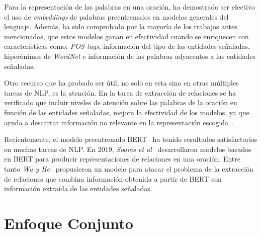Para la representación de las palabras en una oración, ha demostrado ser efectivo el uso de \textit{embeddings} de palabras preentrenados en modelos generales del lenguaje. 
Además, ha sido comprobado por la mayoría de los trabajos antes mencionados, que estos modelos ganan en efectividad cuando se enriquecen con características como: \textit{POS-tags}, información del tipo de las entidades señaladas, hiperónimos de \textit{WordNet} e información de las palabras adyacentes a las entidades señaladas.

Otro recurso que ha probado ser útil, no solo en esta sino en otras múltiples tareas de NLP, es la atención. 
En la tarea de extracción de relaciones se ha verificado que incluir niveles de atención sobre las palabras de la oración en función de las entidades señaladas, mejora la efectividad de los modelos, ya que ayuda a descartar información no relevante en la representación escogida~\cite{huang2016attention, wang2016relation, xiao2016semantic, lee2019semantic}.

Recientemente, el modelo preentrenado BERT~\cite{BERT} ha tenido resultados satisfactorios en muchas tareas de NLP.
En 2019, \textit{Soares et al}~\cite{soares2019matching} desarrollaron modelos basados en BERT para producir representaciones de relaciones en una oración. Entre tanto \textit{Wu y He}~\cite{wu2019enriching} propusieron un modelo para atacar el problema de la extracción de relaciones que combina información obtenida a partir de BERT con información extraída de las entidades señaladas.

\section{Enfoque Conjunto}

